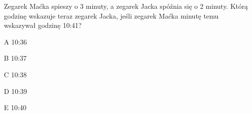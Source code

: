 \begin{tresc}
Zegarek Maćka spieszy o 3 minuty, a zegarek Jacka spóźnia się o 2 minuty. Którą godzinę wskazuje teraz zegarek Jacka, jeśli zegarek Maćka minutę temu wskazywał godzinę 10:41?
\end{tresc}
\begin{wariant}{A} 10:36 \end{wariant}
\begin{wariant}{B} 10:37 \end{wariant}
\begin{wariant}{C} 10:38 \end{wariant}
\begin{wariant}{D} 10:39 \end{wariant}
\begin{wariant}{E} 10:40 \end{wariant}
